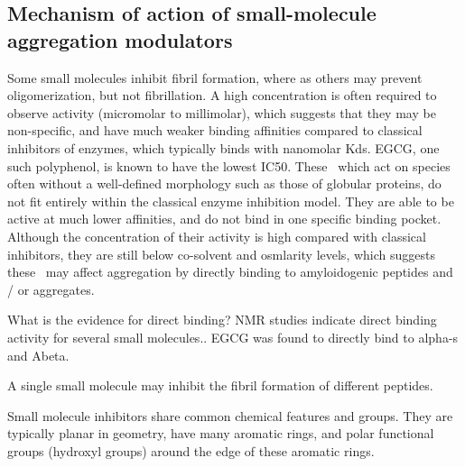 \subsection{Mechanism of action of small-molecule aggregation modulators}
Some small molecules inhibit fibril formation, where as others may prevent oligomerization, but not fibrillation. A high concentration is often required to observe activity (micromolar to millimolar), which suggests that they may be non-specific, and have much weaker binding affinities compared to classical inhibitors of enzymes, which typically binds with nanomolar Kds. EGCG, one such polyphenol, is known to have the lowest IC50.  These \smi\ which act on species often without a well-defined morphology such as those of globular proteins, do not fit entirely within the classical enzyme inhibition model. They are able to be active at much lower affinities, and do not bind in one specific binding pocket.  Although the concentration of their activity is high compared with classical inhibitors,  they are still below co-solvent and osmlarity levels, which suggests these \smi\ may affect aggregation by directly binding to amyloidogenic peptides and / or aggregates.

What is the evidence for direct binding? NMR studies indicate direct binding activity for several small molecules.\cite{XXX EGCG paper nature 2007}.  EGCG was found to directly bind to alpha-s and Abeta.

A single small molecule may inhibit the fibril formation of different peptides.

Small molecule inhibitors share common chemical features and groups.  They are typically planar in geometry, have many aromatic rings, and polar functional groups (hydroxyl groups) around the edge of these aromatic rings.\cite{Stempler:2011dy,Shoval:2007p3547,Porat:2006fn,Lemkul:2012da}



